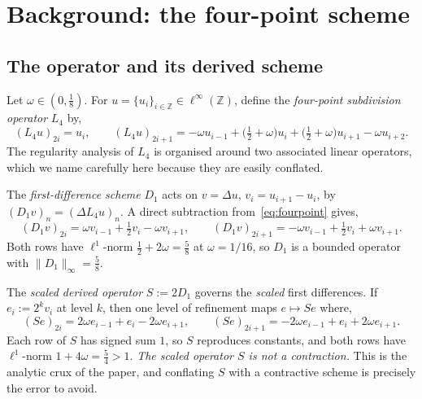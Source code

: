 \documentclass{article}
\theoremstyle{plain}
\theoremstyle{definition}
\newcommand{\Z}{\mathbb{Z}}
\newcommand{\Lop}{L_4}
\newcommand{\norm}[1]{\lVert #1 \rVert}
\begin{document}
\section{Background: the four-point scheme}\label{sec:background}

\subsection{The operator and its derived scheme}

Let $\omega\in(0,\tfrac{1}{8})$. For $u=\{u_i\}_{i\in\Z}\in\ell^\infty(\Z)$,
define the \emph{four-point subdivision operator} $\Lop$ by,
\begin{equation}\label{eq:fourpoint}
  (\Lop u)_{2i} = u_i, \qquad
  (\Lop u)_{2i+1} = -\omega u_{i-1} + \bigl(\tfrac{1}{2}+\omega\bigr)u_i
    + \bigl(\tfrac{1}{2}+\omega\bigr)u_{i+1} - \omega u_{i+2}.
\end{equation}
The regularity analysis of $\Lop$ is organised around two associated linear
operators, which we name carefully here because they are easily conflated.

The \emph{first-difference scheme} $D_1$ acts on $v=\Delta u$, $v_i=u_{i+1}-u_i$,
by $(D_1 v)_n=(\Delta\Lop u)_n$. A direct subtraction from~\eqref{eq:fourpoint}
gives,
\begin{equation}\label{eq:firstdiff}
  (D_1 v)_{2i} = \omega v_{i-1} + \tfrac12 v_i - \omega v_{i+1}, \qquad
  (D_1 v)_{2i+1} = -\omega v_{i-1} + \tfrac12 v_i + \omega v_{i+1}.
\end{equation}
Both rows have $\ell^1$-norm $\tfrac12+2\omega=\tfrac58$ at $\omega=1/16$, so
$D_1$ is a bounded operator with $\norm{D_1}_\infty=\tfrac58$.

The \emph{scaled derived operator} $S:=2D_1$ governs the \emph{scaled} first
differences. If $e_i:=2^k v_i$ at level $k$, then one level of refinement maps
$e\mapsto Se$ where,
\begin{equation}\label{eq:scaledderiv}
  (S e)_{2i} = 2\omega e_{i-1} + e_i - 2\omega e_{i+1}, \qquad
  (S e)_{2i+1} = -2\omega e_{i-1} + e_i + 2\omega e_{i+1}.
\end{equation}
Each row of $S$ has signed sum $1$, so $S$ reproduces constants, and both rows have
$\ell^1$-norm $1+4\omega=\tfrac54>1$. \emph{The scaled operator $S$ is not a
contraction.} This is the analytic crux of the paper, and conflating $S$ with a
contractive scheme is precisely the error to avoid.
\end{document}
